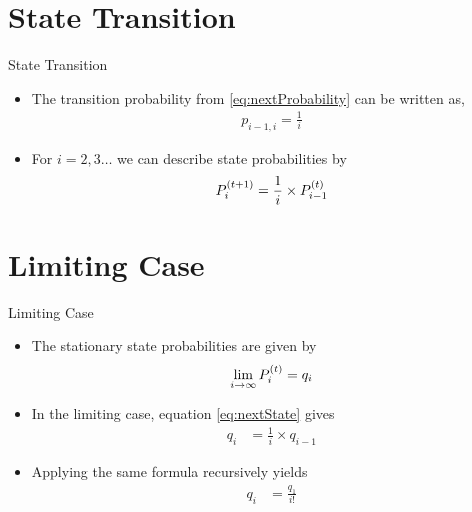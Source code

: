 \documentclass{beamer}
\begin{document}
\section{State Transition}
\begin{frame}{State Transition}
\begin{itemize}
    \item The transition probability from \eqref{eq:nextProbability} can be written as,
    \begin{align}
        p_{i-1,i} = \frac{1}{i} 
    \end{align}
    \item For $i = 2, 3 \dots$ we can describe state probabilities by
    \begin{align}
         P_{i}^{\left(t+1\right)}  =\frac{1}{i} \times P_{i-1}^{\left(t\right)} 
         \label{eq:nextState}
    \end{align}
\end{itemize}
\end{frame}
\section{Limiting Case}
\begin{frame}{Limiting Case}
\begin{itemize}
    \item The stationary state probabilities are given by
    \begin{align}
        \lim\limits_{i \to \infty} P_{i}^{\left(t\right)}  = q_i
    \end{align}
    \item In the limiting case, equation \eqref{eq:nextState} gives
    \begin{align}
        q_i &= \frac{1}{i} \times q_{i-1} 
    \end{align}
    \item Applying the same formula recursively yields
    \begin{align}
        q_i &= \frac{q_1}{i!}
        \label{eq:qi}
    \end{align}
\end{itemize}
\end{frame}
\end{document}

